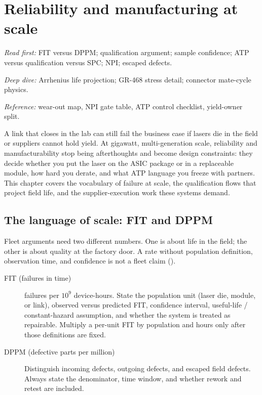 \chapter{Reliability and manufacturing at scale}
\label{ch:reliability}

\textit{Read first:} FIT versus DPPM; qualification argument; sample confidence;
ATP versus qualification versus SPC; NPI; escaped defects.

\textit{Deep dive:} Arrhenius life projection; GR-468 stress detail; connector
mate-cycle physics.

\textit{Reference:} wear-out map, NPI gate table, ATP control checklist,
yield-owner split.

A link that closes in the lab can still fail the business case if lasers die in
the field or suppliers cannot hold yield. At gigawatt, multi-generation scale,
reliability and manufacturability stop being afterthoughts and become design
constraints: they decide whether you put the laser on the ASIC package or in a
replaceable module, how hard you derate, and what ATP language you freeze with
partners. This chapter covers the vocabulary of failure at scale, the
qualification flows that project field life, and the supplier-execution work these
systems demand.

\section{The language of scale: FIT and DPPM}
\label{sec:fit-dppm}

Fleet arguments need two different numbers. One is about life in the field; the
other is about quality at the factory door. A rate without population
definition, observation time, and confidence is not a fleet claim
().

\begin{description}
\item[FIT (failures in time)] failures per $10^{9}$ device-hours.
      State the population unit (laser die, module, or link), observed versus
      predicted FIT, confidence interval, useful-life / constant-hazard
      assumption, and whether the system is treated as repairable. Multiply a
      per-unit FIT by population and hours only after those definitions are
      fixed.
\item[DPPM (defective parts per million)] Distinguish incoming defects, outgoing
      defects, and escaped field defects. Always state the denominator, time
      window, and whether rework and retest are included.
\end{description}

